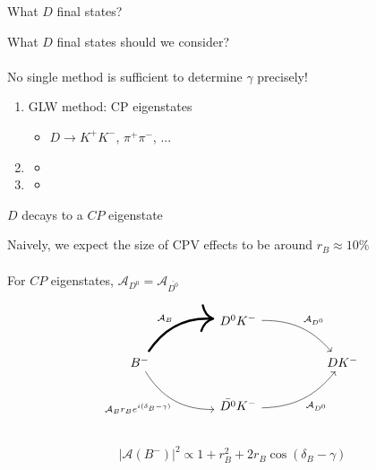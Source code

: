 \documentclass[dvipsnames]{beamer}
\begin{document}
\begin{frame}{What $D$ final states?}
  \begin{center}
    \Large What $D$ final states should we consider?\\~\\
    \Large No single method is sufficient to determine $\gamma$ precisely!
  \end{center}
  \vspace{0.2cm}
  \begin{enumerate}
    \setlength\itemsep{1.0em}
    \item{GLW method: CP eigenstates}
    \begin{itemize}
      \item{$D\to K^+K^-$, $\pi^+\pi^-$, ...}
    \end{itemize}
    \item{\phantom{ADS method: Doubly-Cabbibo Suppressed decays}}
    \begin{itemize}
      \item[]{\phantom{$D\to K^-\pi^+$, $K^-\pi^+\pi^-\pi^+$, ...}}
    \end{itemize}
    \item{\phantom{BPGGSZ method: Multi-body final states}}
    \begin{itemize}
      \item[]{\phantom{$D\to K_S^0\pi^+\pi^-$, $K_S^0K^+K^-$, ...}}
    \end{itemize}
  \end{enumerate}
\end{frame}

\begin{frame}[fragile]{$D$ decays to a $C\!P$ eigenstate}
  \begin{center}
    Naively, we expect the size of CPV effects to be around $r_B\approx10\%$\\~\\
    For $C\!P$ eigenstates, $\mathcal{A}_{D^0} = \mathcal{A}_{\bar{D^0}}$
  \end{center}
  \begin{equation*}
    \begin{tikzcd}[column sep=huge]
      & D^0K^- \arrow[dr, bend left = 25, "\mathcal{A}_{D^0}"] & \\
      B^- \arrow[ur, bend left, line width = 1.7, "\mathcal{A}_B"] \arrow[dr, bend right, "\mathcal{A}_B r_B e^{i(\delta_B - \gamma)}"'] & [5cm] & DK^- \\
      & \bar{D^0}K^- \arrow[ur, bend right = 25, "\mathcal{A}_{D^0}"'] & \\
    \end{tikzcd}
  \end{equation*}
  \begin{equation*}
    \lvert\mathcal{A}(B^-)\lvert^2\propto1 + r_B^2 + 2r_B\cos(\delta_B - \gamma)
  \end{equation*}
\end{frame}
\end{document}
